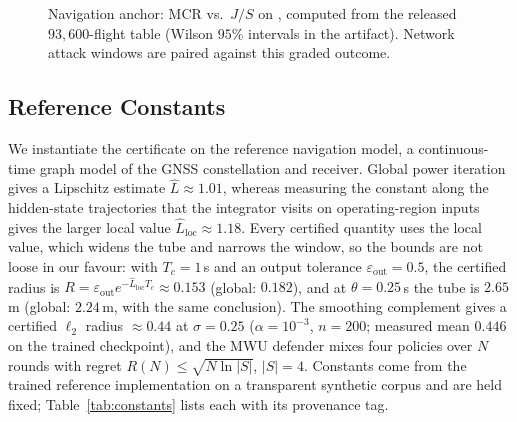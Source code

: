 \begin{figure}[t]
\centering
{}
\caption{Navigation anchor: MCR vs.\ $J/S$ on ,
computed from the released $93{,}600$-flight table (Wilson $95\%$ intervals in
the artifact). Network attack windows are paired against this graded
outcome.}
\label{fig:mcr}
\end{figure}

\subsection{Reference Constants}
We instantiate the certificate on the reference navigation model, a
continuous-time graph model of the GNSS constellation and receiver. Global
power iteration gives a Lipschitz estimate $\hat L\approx1.01$, whereas
measuring the constant along the hidden-state trajectories that the integrator
visits on operating-region inputs gives the larger local value
$\hat L_{\mathrm{loc}}\approx1.18$. Every certified quantity uses the local
value, which widens the tube and narrows the window, so the bounds are not
loose in our favour: with $T_c=1$\,s and an output tolerance
$\varepsilon_{\mathrm{out}}=0.5$, the certified radius is
$R=\varepsilon_{\mathrm{out}}e^{-\hat L_{\mathrm{loc}}T_c}\approx0.153$
(global: $0.182$), and at $\theta{=}0.25$\,s the tube is $2.65$\,m (global:
$2.24$\,m, with the same conclusion). The smoothing complement gives a certified $\ell_2$ radius
$\approx0.44$ at $\sigma=0.25$ ($\alpha=10^{-3}$, $n=200$; measured mean
$0.446$ on the trained checkpoint), and the MWU defender mixes four policies
over $N$ rounds with regret $R(N)\le\sqrt{N\ln|S|}$, $|S|=4$. Constants come from
the trained reference implementation on a transparent synthetic corpus and are
held fixed; Table~\ref{tab:constants} lists each with its provenance tag.


